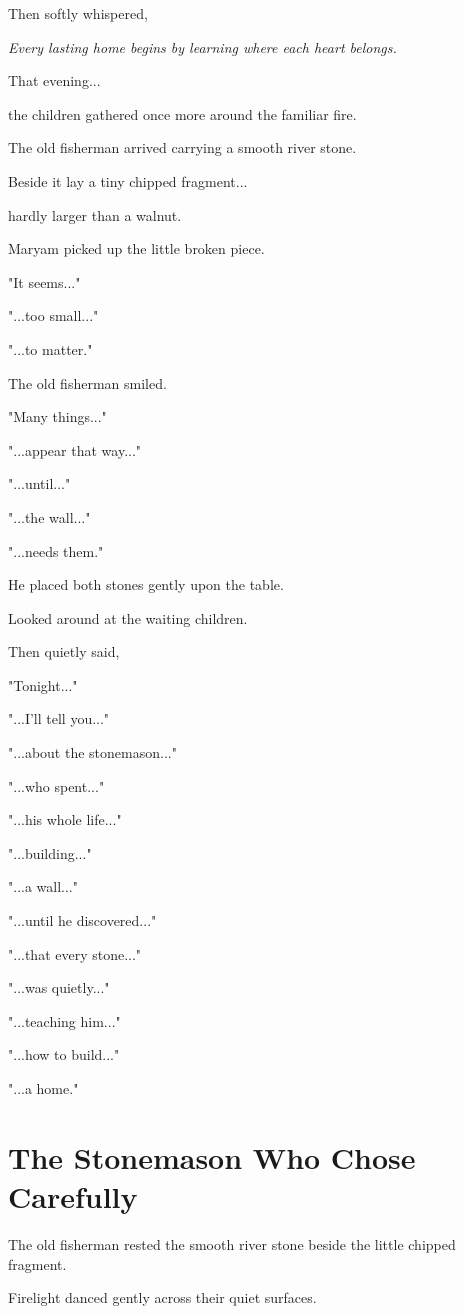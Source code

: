 \documentclass[12pt,openany]{book}
\begin{document}
Then softly whispered,

\emph{Every lasting home begins by learning where each heart belongs.}

That evening...

the children gathered once more around the familiar fire.

The old fisherman arrived carrying a smooth river stone.

Beside it lay a tiny chipped fragment...

hardly larger than a walnut.

Maryam picked up the little broken piece.

"It seems..."

"...too small..."

"...to matter."

The old fisherman smiled.

"Many things..."

"...appear that way..."

"...until..."

"...the wall..."

"...needs them."

He placed both stones gently upon the table.

Looked around at the waiting children.

Then quietly said,

"Tonight..."

"...I'll tell you..."

"...about the stonemason..."

"...who spent..."

"...his whole life..."

"...building..."

"...a wall..."

"...until he discovered..."

"...that every stone..."

"...was quietly..."

"...teaching him..."

"...how to build..."

"...a home."
\section*{The Stonemason Who Chose Carefully}

The old fisherman rested the smooth river stone beside the little chipped fragment.

Firelight danced gently across their quiet surfaces.
\end{document}
